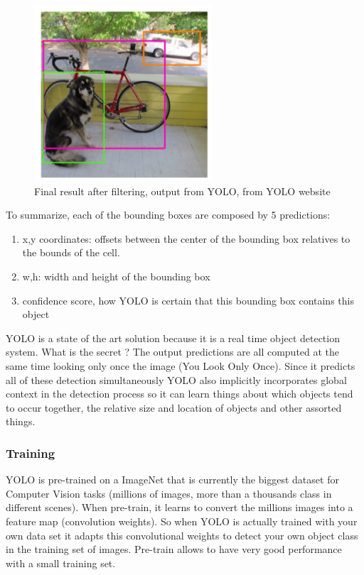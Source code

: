 \begin{figure} [!ht]
    \centering
    \includegraphics[width=0.3\linewidth]{images/yolo_final_filter.png}
    \caption{Final result after filtering, output from YOLO, from YOLO website}
    \label{pict:yolo_final_filter}
\end{figure}

\newpage

To summarize, each of the bounding boxes are composed by 5 predictions:
\begin{enumerate}
    \item x,y coordinates: offsets between the center of the bounding box relatives to the bounds of the cell.
    \item w,h: width and height of the bounding box
    \item confidence score, how YOLO is certain that this bounding box contains this object
\end{enumerate}

YOLO is a state of the art solution because it is a real time object detection system. What is the secret ? The output predictions are all computed at the same time looking only once the image (You Look Only Once). Since it predicts all of these detection simultaneously YOLO also implicitly incorporates global context in the detection process so it can learn things about which objects tend to occur together, the relative size and location of objects and other assorted things.

\subsubsection{Training}

YOLO is pre-trained on a ImageNet that is currently the biggest dataset for Computer Vision tasks (millions of images, more than a thousands class in different scenes). When pre-train, it learns to convert the millions images into a feature map (convolution weights). So when YOLO is actually trained with your own data set it adapts this convolutional weights to detect your own object class in the training set of images. Pre-train allows to have very good performance with a small training set. 

